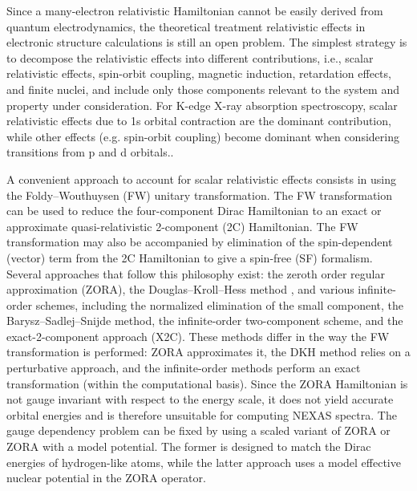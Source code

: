 \documentclass{article}
\begin{document}
Since a many-electron relativistic Hamiltonian cannot be easily derived from quantum electrodynamics, the theoretical treatment relativistic effects in electronic structure calculations is still an open problem.\cite{Dyall-book,Wolf-book,moss-book,grant-book,Kutzelnigg2012-review}
The simplest strategy is to decompose the  relativistic effects into different contributions,
i.e., scalar relativistic effects, spin-orbit coupling, magnetic induction, retardation effects, and finite nuclei, and include only those components relevant to the system and property under consideration\cite{Cremer,Reiher-X2C,Rel-review-UB,Rel-review-Trond,Rel-review-Wenjian}. For K-edge X-ray absorption spectroscopy, scalar relativistic effects due to 1s orbital contraction are the dominant contribution, while other effects (e.g. spin-orbit coupling) become dominant when considering transitions from p and d orbitals.\cite{schwerdtfeger-book2,C-imp,Rel-review-UB,Dyall-book}.

A convenient approach to account for scalar relativistic effects consists in using the Foldy--Wouthuysen\cite{FW,Heully} (FW) unitary transformation.
The FW transformation can be used to reduce the four-component Dirac Hamiltonian to an exact or approximate quasi-relativistic 2-component (2C) Hamiltonian.
The FW transformation may also be accompanied by elimination of the spin-dependent (vector) term from the 2C Hamiltonian to give a spin-free (SF) formalism. 
Several approaches that follow this philosophy exist: the zeroth order regular approximation (ZORA)\cite{ZORA-chang,ZORA-VBS,ZORA-VBS-2}, the Douglas--Kroll--Hess method \cite{DKH,DKH-V,DKHn-vW,DKHn-Reiher,DKHn-Hirao}, and various infinite-order schemes, including the normalized elimination of the small component,\cite{Dyall-NESC,X2C-Dyall2001,NESC-X2C,ZFC} the Barysz--Sadlej--Snijde method\cite{BSS-1}, the infinite-order two-component scheme\cite{IOTC-previous,IOTC-eig}, and the exact-2-component approach (X2C).\cite{Kutzelnigg-matrix1, llias, X2C-Liu2006,X2C-KUt-Liu2007,IOTC-trond,X2C-Liu2007,X2C-Liu2009}
These methods differ in the way the FW transformation is performed: ZORA approximates it, the DKH method relies on a perturbative approach, and the infinite-order methods perform an exact transformation (within the computational basis).
Since the ZORA Hamiltonian is not gauge invariant with respect to the energy scale,\cite{ZROA-energy-p-VW,ZORA-fix-energy-scale,Nwchem-zora} it does not yield accurate orbital energies and is therefore unsuitable for computing NEXAS spectra.
The gauge dependency problem can be fixed by using a scaled variant of ZORA\cite{scaled-ZORA,ZORA-fix-energy-scale} or ZORA with a model potential\cite{ZROA-energy-p-VW}. The former is designed to match the Dirac energies of hydrogen-like atoms, while the latter approach uses a model effective nuclear potential in the ZORA operator.
  
\end{document}
